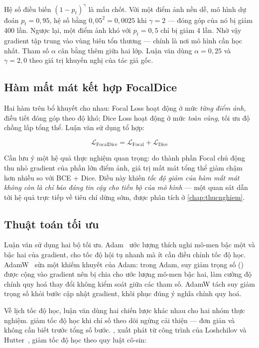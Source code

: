 Hệ số điều biến $(1-p_t)^{\gamma}$ là mấu chốt. Với một điểm ảnh nền dễ, mô hình
dự đoán $p_t = 0{,}95$, hệ số bằng $0{,}05^{2} = 0{,}0025$ khi $\gamma = 2$ ---
đóng góp của nó bị giảm 400 lần. Ngược lại, một điểm ảnh khó với $p_t = 0{,}5$
chỉ bị giảm 4 lần. Nhờ vậy gradient tập trung vào vùng biên tổn thương --- chính
là nơi mô hình cần học nhất. Tham số $\alpha$ cân bằng thêm giữa hai lớp. Luận văn
dùng $\alpha = 0{,}25$ và $\gamma = 2{,}0$ theo giá trị khuyến nghị của tác giả
gốc.

\subsection{Hàm mất mát kết hợp FocalDice}

Hai hàm trên bổ khuyết cho nhau: Focal Loss hoạt động ở mức \emph{từng điểm ảnh},
điều tiết đóng góp theo độ khó; Dice Loss hoạt động ở mức \emph{toàn vùng}, tối
ưu độ chồng lấp tổng thể. Luận văn sử dụng tổ hợp:

\begin{equation}
    \mathcal{L}_{\text{FocalDice}} = \mathcal{L}_{\text{Focal}} + \mathcal{L}_{\text{Dice}}
    \label{eq:focaldice}
\end{equation}

Cần lưu ý một hệ quả thực nghiệm quan trọng: do thành phần Focal chủ động thu nhỏ
gradient của phần lớn điểm ảnh, giá trị mất mát tổng thể giảm chậm hơn nhiều so
với BCE + Dice. Điều này khiến \emph{tốc độ giảm của hàm mất mát không còn là chỉ
báo đáng tin cậy cho tiến bộ của mô hình} --- một quan sát dẫn tới hệ quả trực
tiếp về tiêu chí dừng sớm, được phân tích ở \cref{chap:thucnghiem}.

\subsection{Thuật toán tối ưu}

Luận văn sử dụng hai bộ tối ưu. Adam~\cite{kingma2015adam} ước lượng thích nghi
mô-men bậc một và bậc hai của gradient, cho tốc độ hội tụ nhanh mà ít cần điều
chỉnh tốc độ học. AdamW~\cite{loshchilov2019adamw} sửa một khiếm khuyết của Adam:
trong Adam, suy giảm trọng số () được cộng vào gradient nên bị
chia cho ước lượng mô-men bậc hai, làm cường độ chính quy hoá thay đổi không kiểm
soát giữa các tham số. AdamW tách suy giảm trọng số khỏi bước cập nhật gradient,
khôi phục đúng ý nghĩa chính quy hoá.

Về lịch tốc độ học, luận văn dùng hai chiến lược khác nhau cho hai nhóm thực
nghiệm.  giảm tốc độ học khi chỉ số theo dõi ngừng cải
thiện --- đơn giản và không cần biết trước tổng số bước. ,
xuất phát từ công trình của Loshchilov và Hutter~\cite{loshchilov2017sgdr}, giảm
tốc độ học theo quy luật cô-sin:

